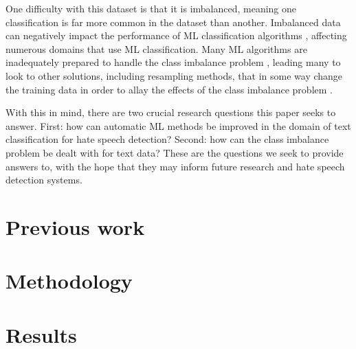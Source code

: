 \documentclass[runningheads]{llncs}
\begin{document}
One difficulty with this dataset is that it is imbalanced, meaning one classification is far more common in the dataset than another. Imbalanced data can negatively impact the performance of ML classification algorithms \cite{sun}, affecting numerous domains that use ML classification. Many ML algorithms are inadequately prepared to handle the class imbalance problem \cite{sun}, leading many to look to other solutions, including resampling methods, that in some way change the training data in order to allay the effects of the class imbalance problem \cite{japkowicz}.

With this in mind, there are two crucial research questions this paper seeks to answer. First: how can automatic ML methods be improved in the domain of text classification for hate speech detection? Second: how can the class imbalance problem be dealt with for text data? These are the questions we seek to provide answers to, with the hope that they may inform future research and hate speech detection systems.

\section{Previous work}






\section{Methodology}





\section{Results}
\end{document}
